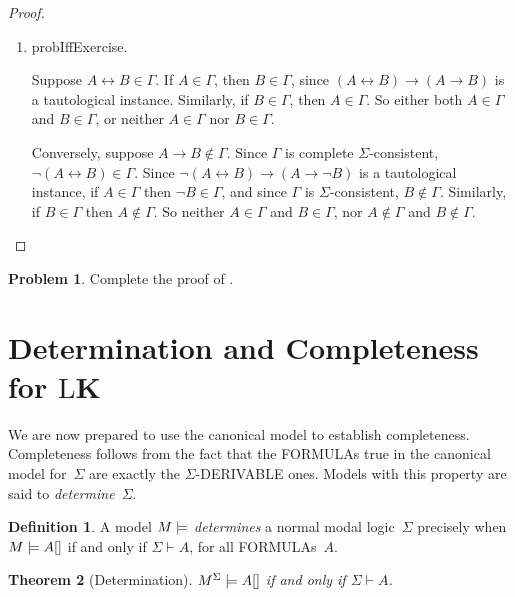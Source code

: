 \documentclass[10pt,a4paper]{article}
\makeatletter
\newcommand*{\olup}[1]{\MakeUppercase{#1}}
\theoremstyle{plain}
\newtheorem{thm}{Theorem}[section]
\theoremstyle{definition}
\newtheorem{defn}[thm]{Definition}
\newtheorem{prob}{Problem}[section]
\theoremstyle{remark}
\newenvironment{probtag}[1]{\begin{prob}}{\end{prob}}
\newcommand*{\olfileid}[3]{}
\newcommand*{\olsection}[1]{\section*{#1}}
\newcommand*{\ollabel}[1]{\label{#1}}
\newcommand{\olref}{\@ifnextchar[{\olref@i}{\olref@final}}
\def\olref@i[#1]{\@ifnextchar[{\olref@ii}{\olref@final}}
\def\olref@ii[#1]{\@ifnextchar[{\olref@iii}{\olref@final}}
\def\olref@iii[#1]{\olref@final}
\def\olref@final#1{\ref{#1}}
\providecommand{\lif}{\mathbin{\rightarrow}}
\providecommand{\Proves}{\mathrel{\vdash}}
\providecommand{\mSat}[3]{\ensuremath{#1 \models #2[#3]}}
\providecommand{\mModel}[2]{\ensuremath{#1 \models #2}}
\providecommand{\Log}{\ensuremath{\mathrm{L}}}
\providecommand{\iftag}[1]{#1}
\providecommand{\tagitem}[1]{\item[#1]}
\providecommand{\liff}{\mathbin{\leftrightarrow}}
\providecommand{\iftag}{}
\makeatother
\begin{document}
\begin{proof}
\begin{enumerate}
  \tagitem{prvIff}{\iftag{probIff}{Exercise.}{Suppose $A \liff B \in
      \Gamma$. If $A \in \Gamma$, then $B \in \Gamma$, since $(A
      \liff B) \lif (A \lif B)$ is a tautological
      instance. Similarly, if $B \in \Gamma$, then $A \in \Gamma$.
      So either both $A \in \Gamma$ and $B \in \Gamma$, or neither
      $A \in \Gamma$ nor $B \in \Gamma$.
      
      Conversely, suppose $A \lif B \notin \Gamma$. Since $\Gamma$
      is complete $\Sigma$-consistent, $\lnot (A \liff B) \in
      \Gamma$. Since $\lnot(A \liff B) \lif (A \lif \lnot B)$ is a
      tautological instance, if $A \in \Gamma$ then $\lnot B \in
      \Gamma$, and since $\Gamma$ is $\Sigma$-consistent, $B \notin
      \Gamma$. Similarly, if $B \in \Gamma$ then $A \notin \Gamma$.
      So neither $A \in \Gamma$ and $B \in \Gamma$, nor $A \notin
      \Gamma$ and $B \notin \Gamma$.}}{}
  \end{enumerate}
\end{proof}

\begin{probtag}{probAnd,probOr,probIf,probIff}
  Complete the proof of \olref[nml][com][ccs]{prop:ccs-properties}.
\end{probtag}





\olfileid{nml}{com}{cmk}

\olsection{Determination and Completeness for  \Log{K}}

We are now prepared to use the canonical model to establish
completeness. Completeness follows from the fact that the \olup{formula}s
true in the canonical model for~$\Sigma$ are exactly the
$\Sigma$-\olup{derivable} ones. Models with this property are said to
\emph{determine}~$\Sigma$.

\begin{defn}
  A model $\mModel{M}$ \emph{determines} a normal modal
  logic~$\Sigma$ precisely when $\mSat{M}{A}$ if and only if $\Sigma
  \Proves A$, for all \olup{formula}s~$A$.
\end{defn}

\begin{thm}[Determination]\ollabel{thm:determination}
   $\mSat{M^\Sigma}{A}$ if and only if $\Sigma \Proves A$.
\end{thm}
\end{document}
